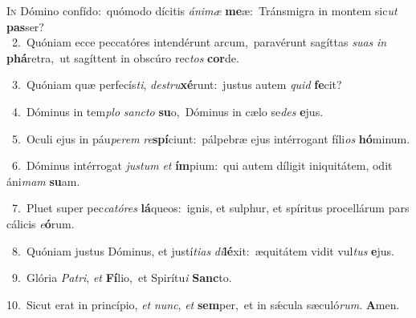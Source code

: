 \lettrine{\initial\textcolor{\initialcolor}{I}}{n} Dómino confído:~\dagger quómodo dícitis \textit{á}\-\textit{ni}\textit{mæ} \textbf{me}\-æ:~\star Tránsmigra in montem sic\textit{ut} \textbf{pas}\-ser?\\
{\numbfont\textcolor{\numbcolor}{~2.}}~Quóniam ecce peccatóres intendérunt arcum,~\dagger paravérunt sagíttas \textit{su}\-\textit{as} \textit{in} \textbf{phá}\-retra,~\star ut sagíttent in obscúro rec\textit{tos} \textbf{cor}\-de.\par
{\numbfont\textcolor{\numbcolor}{~3.}}~Quóniam quæ perfecís\-\textit{ti}\-, \textit{de}\-\textit{stru}\textbf{xé}runt:~\star justus autem \textit{quid} \textbf{fe}\-cit?\par
{\numbfont\textcolor{\numbcolor}{~4.}}~Dóminus in tem\textit{plo} \textit{sanc}\-\textit{to} \textbf{su}\-o,~\star Dóminus in cælo se\textit{des} \textbf{e}\-jus.\par
{\numbfont\textcolor{\numbcolor}{~5.}}~Oculi ejus in páu\-\textit{pe}\-\textit{rem} \textit{re}\-\textbf{spí}ciunt:~\star pálpebræ ejus intérrogant fíli\textit{os} \textbf{hó}\-minum.\par
{\numbfont\textcolor{\numbcolor}{~6.}}~Dóminus intérrogat \textit{jus}\-\textit{tum} \textit{et} \textbf{ím}\-pium:~\star qui autem díligit iniquitátem, odit áni\textit{mam} \textbf{su}\-am.\par
{\numbfont\textcolor{\numbcolor}{~7.}}~Pluet super pec\-\textit{ca}\-\textit{tó}\textit{res} \textbf{lá}\-queos:~\star ignis, et sulphur, et spíritus procellárum pars cálicis \textit{e}\-\textbf{ó}rum.\par
{\numbfont\textcolor{\numbcolor}{~8.}}~Quóniam justus Dóminus, et justí\-\textit{ti}\-\textit{as} \textit{di}\-\textbf{lé}xit:~\star æquitátem vidit vul\textit{tus} \textbf{e}\-jus.\par
{\numbfont\textcolor{\numbcolor}{~9.}}~Glória \textit{Pa}\-\textit{tri}, \textit{et} \textbf{Fí}\-lio,~\star et Spirítu\textit{i} \textbf{Sanc}\-to.\par
{\numbfont\textcolor{\numbcolor}{10.}}~Sicut erat in princípio, \textit{et} \textit{nunc}\-, \textit{et} \textbf{sem}\-per,~\star et in sǽcula sæculó\-\textit{rum}\-. \textbf{A}\-men.\par
